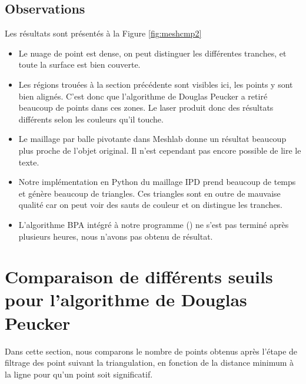 \documentclass[a4paper,10pt]{report}
\begin{document}
\subsection{Observations}
Les résultats sont présentés à la Figure \ref{fig:meshcmp2}
\begin{itemize}
	\item Le nuage de point est dense, on peut distinguer les différentes tranches, et toute la surface est bien couverte.
    \item Les régions trouées à la section précédente sont visibles ici, les points y sont bien alignés. C'est donc que l'algorithme de Douglas Peucker a retiré beaucoup de points dans ces zones. Le laser produit donc des résultats différents selon les couleurs qu'il touche.
    \item Le maillage par balle pivotante dans Meshlab donne un résultat beaucoup plus proche de l'objet original. Il n'est cependant pas encore possible de lire le texte.
    \item Notre implémentation en Python du maillage IPD prend beaucoup de temps et génère beaucoup de triangles. Ces triangles sont en outre de mauvaise qualité car on peut voir des sauts de couleur et on distingue les tranches.
    \item L'algorithme BPA intégré à notre programme (\cite{Digne}) ne s'est pas terminé après plusieurs heures, nous n'avons pas obtenu de résultat.
\end{itemize}

\section{Comparaison de différents seuils pour l'algorithme de Douglas Peucker}

Dans cette section, nous comparons le nombre de points obtenus après l'étape de filtrage des point suivant la triangulation, en fonction de la distance minimum à la ligne pour qu'un point soit significatif.
\end{document}
